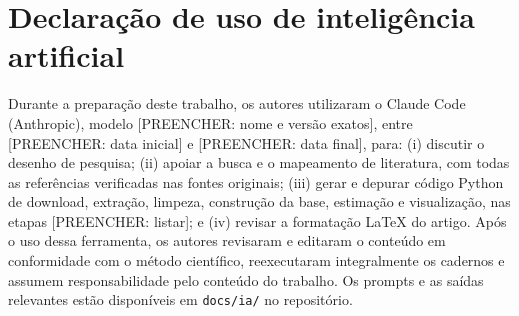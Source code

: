 \section*{Declaração de uso de inteligência artificial}

Durante a preparação deste trabalho, os autores utilizaram o Claude Code
(Anthropic), modelo [PREENCHER: nome e versão exatos], entre
[PREENCHER: data inicial] e [PREENCHER: data final], para: (i) discutir o
desenho de pesquisa; (ii) apoiar a busca e o mapeamento de literatura, com
todas as referências verificadas nas fontes originais; (iii) gerar e depurar
código Python de download, extração, limpeza, construção da base, estimação e
visualização, nas etapas [PREENCHER: listar]; e (iv) revisar a formatação
LaTeX do artigo. Após o uso dessa ferramenta, os autores revisaram e editaram
o conteúdo em conformidade com o método científico, reexecutaram
integralmente os cadernos e assumem responsabilidade pelo conteúdo do
trabalho. Os prompts e as saídas relevantes estão disponíveis em
\texttt{docs/ia/} no repositório.
